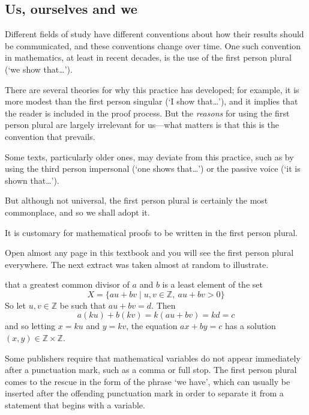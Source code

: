 \subsection*{Us, ourselves and we}

Different fields of study have different conventions about how their results should be communicated, and these conventions change over time. One such convention in mathematics, at least in recent decades, is the use of the first person plural (`we show that\dots{}').

There are several theories for why this practice has developed; for example, it is more modest than the first person singular (`I show that\dots{}'), and it implies that the reader is included in the proof process. But the \textit{reasons} for using the first person plural are largely irrelevant for us---what matters is that this is the convention that prevails.

Some texts, particularly older ones, may deviate from this practice, such as by using the third person impersonal (`one shows that\dots{}') or the passive voice (`it is shown that\dots{}').

But although not universal, the first person plural is certainly the most commonplace, and so we shall adopt it.

\begin{writingprinciple}
\label{wpFirstPersonPlural}
It is customary for mathematical proofs to be written in the first person plural.
\end{writingprinciple}

Open almost any page in this textbook and you will see the first person plural everywhere. The next extract was taken almost at random to illustrate.

\begin{extract}
  that a greatest common divisor of $a$ and $b$ is a least element of the set
\[ X = \{ au+bv \mid u,v \in \mathbb{Z},\ au+bv > 0 \} \]
So let $u,v \in \mathbb{Z}$ be such that $au+bv=d$. Then
\[ a(ku) + b(kv) = k(au+bv) = kd = c \]
and so letting $x=ku$ and $y=kv$,  the equation $ax+by=c$ has a solution $(x,y) \in \mathbb{Z} \times \mathbb{Z}$.
\end{extract}

Some publishers require that mathematical variables do not appear immediately after a punctuation mark, such as a comma or full stop. The first person plural comes to the rescue in the form of the phrase `we have', which can usually be inserted after the offending punctuation mark in order to separate it from a statement that begins with a variable.

